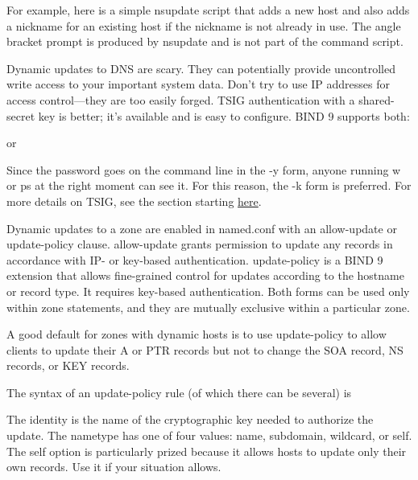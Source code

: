 For example, here is a simple {nsupdate} script that adds a new host and
also adds a nickname for an existing host if the nickname is not already
in use. The angle bracket prompt is produced by {nsupdate} and is not
part of the command script.


Dynamic updates to DNS are scary. They can potentially provide
uncontrolled write access to your important system data. Don't try to
use IP addresses for access control---they are too easily forged. TSIG
authentication with a shared-secret key is better; it's available and is
easy to configure. BIND 9 supports both:


or


Since the password goes on the command line in the {-y} form, anyone
running {w} or {ps} at the right moment can see it. For this reason, the
{-k} form is preferred. For more details on TSIG, see the section
starting
\protect\hyperlink{part0024_split_057.htmlux5cux23_idTextAnchor936}{here}.

\protect\hypertarget{part0024_split_052.htmlux5cux23_idTextAnchor929}{}{}Dynamic
updates to a zone are enabled in {named.conf} with an {allow-update} or
{update-policy} clause. {allow-update} grants permission to update any
records in accordance with IP- or key-based authentication.
{update-policy} is a BIND 9 extension that allows fine-grained control
for updates according to the hostname or record type. It requires
key-based authentication. Both forms can be used only within {zone}
statements, and they are mutually exclusive within a particular {zone}.

A good default for zones with dynamic hosts is to use {update-policy} to
allow clients to update their A or PTR records but not to change the SOA
record, NS records, or KEY records.

The syntax of an {update-policy} rule (of which there can be several) is


The {identity} is the name of the cryptographic key needed to authorize
the update. The {nametype} has one of four values: {name}, {subdomain},
{wildcard}, or {self}. The {self} option is particularly prized because
it allows hosts to update only their own records. Use it if your
situation allows.


